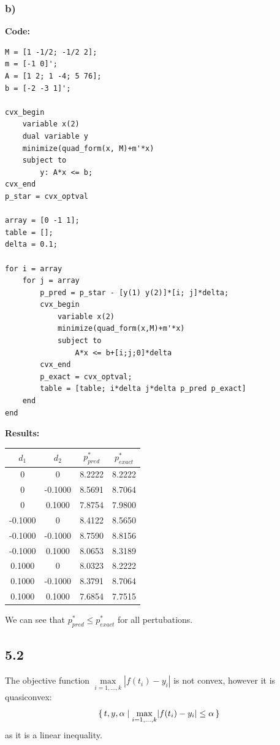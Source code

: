 \documentclass[12pt]{article}
\begin{document}
\subsubsection*{b)}
\textbf{Code:}
\begin{lstlisting}
M = [1 -1/2; -1/2 2];
m = [-1 0]';
A = [1 2; 1 -4; 5 76];
b = [-2 -3 1]';

cvx_begin
    variable x(2)
    dual variable y
    minimize(quad_form(x, M)+m'*x)
    subject to
        y: A*x <= b;
cvx_end
p_star = cvx_optval

array = [0 -1 1];
table = [];
delta = 0.1;

for i = array
    for j = array
        p_pred = p_star - [y(1) y(2)]*[i; j]*delta;
        cvx_begin
            variable x(2)
            minimize(quad_form(x,M)+m'*x)
            subject to
                A*x <= b+[i;j;0]*delta
        cvx_end
        p_exact = cvx_optval;
        table = [table; i*delta j*delta p_pred p_exact]
    end
end
\end{lstlisting}
\textbf{Results:}
\begin{center}
  \begin{tabular}{ | c | c | c | c |}
  \hline
    $d_1$ & $d_2$ & $p^*_{pred}$ & $p^*_{exact}$ \\ \hline
    0 &        0  &  8.2222  &  8.2222 \\ \hline
    0&   -0.1000    &8.5691   & 8.7064 \\ \hline
    0    &0.1000    &7.8754    &7.9800 \\ \hline
    -0.1000&         0 &   8.4122 &    8.5650 \\ \hline
    -0.1000&   -0.1000  &  8.7590  &  8.8156 \\ \hline
    -0.1000&    0.1000  &  8.0653  &  8.3189 \\ \hline
    0.1000 &        0   & 8.0323   & 8.2222 \\ \hline
    0.1000 &  -0.1000    & 8.3791   & 8.7064 \\ \hline
    0.1000 &   0.1000   & 7.6854   & 7.7515 \\ \hline
  \end{tabular}
\end{center}
We can see that $p^*_{pred} \le p^*_{exact}$ for all pertubations.

\subsection*{5.2}
The objective function $\underset{i=1,\dots,k}{\max}|f(t_i)-y_i|$ is not convex, however it is quasiconvex: $$\set{t,y,\alpha | \underset{i=1,\dots,k}{\max}|f(t_i)-y_i| \le \alpha}$$
as it is a linear inequality.\\\\
\end{document}
